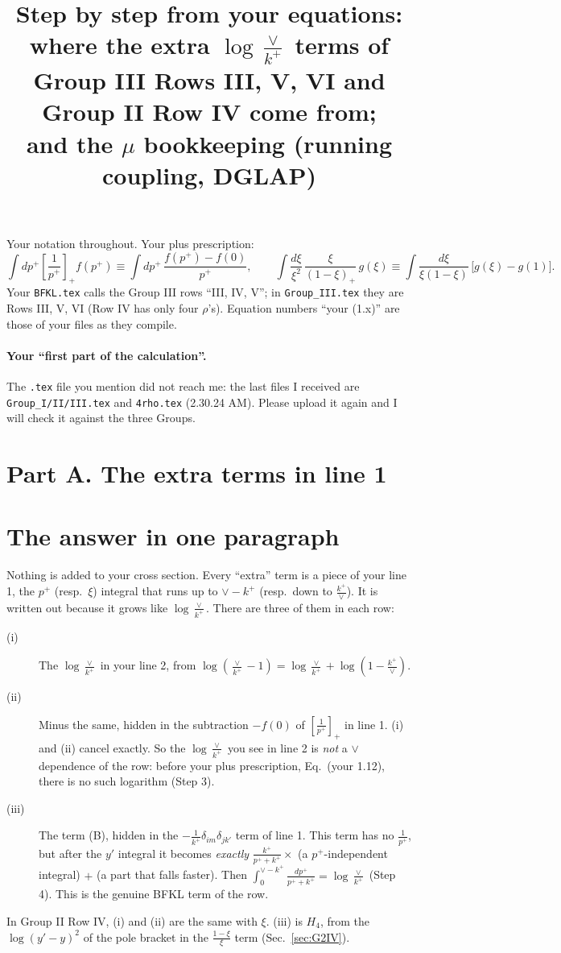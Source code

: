 \documentclass[10pt]{article}
\title{Step by step from your equations:\\ where the extra $\log\frac{\vee}{k^+}$ terms of Group III Rows III, V, VI and Group II Row IV come from;\\ and the $\mu$ bookkeeping (running coupling, DGLAP)}
\date{}
\numberwithin{equation}{section}
\begin{document}
\maketitle
\noindent Your notation throughout. Your plus prescription:
\begin{equation}
\int dp^+\left[\frac{1}{p^+}\right]_+f(p^+)\equiv\int dp^+\,\frac{f(p^+)-f(0)}{p^+},\qquad
\int\frac{d\xi}{\xi^2}\,\frac{\xi}{(1-\xi)_+}\,g(\xi)\equiv\int\frac{d\xi}{\xi(1-\xi)}\,\big[g(\xi)-g(1)\big].
\label{eq:plus}
\end{equation}
Your \texttt{BFKL.tex} calls the Group III rows ``III, IV, V''; in \texttt{Group\_III.tex} they are Rows III, V, VI (Row IV has only four $\rho$'s). Equation numbers ``your (1.x)'' are those of your files as they compile.

\paragraph{Your ``first part of the calculation''.} The \texttt{.tex} file you mention did not reach me: the last files I received are \texttt{Group\_I/II/III.tex} and \texttt{4rho.tex} (2.30.24 AM). Please upload it again and I will check it against the three Groups.

\section*{Part A. The extra terms in line 1}
\section{The answer in one paragraph}
Nothing is added to your cross section. Every ``extra'' term is a piece of your line 1, the $p^+$ (resp.\ $\xi$) integral that runs up to $\vee-k^+$ (resp.\ down to $\frac{k^+}{\vee}$). It is written out because it grows like $\log\frac{\vee}{k^+}$. There are three of them in each row:
\begin{description}
\item[(i)] The $\log\frac{\vee}{k^+}$ in your line 2, from $\log(\frac{\vee}{k^+}-1)=\log\frac{\vee}{k^+}+\log(1-\frac{k^+}{\vee})$.
\item[(ii)] Minus the same, hidden in the subtraction $-f(0)$ of $\left[\frac{1}{p^+}\right]_+$ in line 1. (i) and (ii) cancel exactly. So the $\log\frac{\vee}{k^+}$ you see in line 2 is \emph{not} a $\vee$ dependence of the row: before your plus prescription, Eq.~(your 1.12), there is no such logarithm (Step 3).
\item[(iii)] The term (B), hidden in the $-\frac{1}{k^+}\delta_{im}\delta_{jk'}$ term of line 1. This term has no $\frac{1}{p^+}$, but after the $y'$ integral it becomes \emph{exactly} $\frac{k^+}{p^++k^+}\times$ (a $p^+$-independent integral) $+$ (a part that falls faster). Then $\int_0^{\vee-k^+}\frac{dp^+}{p^++k^+}=\log\frac{\vee}{k^+}$ (Step 4). This is the genuine BFKL term of the row.
\end{description}
In Group II Row IV, (i) and (ii) are the same with $\xi$. (iii) is $H_4$, from the $\log(y'-y)^2$ of the pole bracket in the $\frac{1-\xi}{\xi}$ term (Sec.~\ref{sec:G2IV}).
\end{document}
